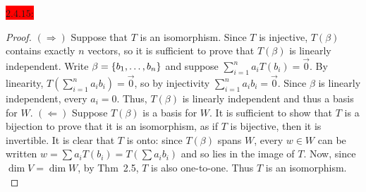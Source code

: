 \documentclass{exam}
\begin{document}
  \colorbox{red}{\underline{$2.4.15$}:}
  \begin{solution}
    \begin{proof}
      $(\Rightarrow)$ Suppose that $T$ is an isomorphism. Since $T$ is injective, $T(\beta)$ contains exactly $n$ vectors, so it is sufficient to prove that $T(\beta)$ is linearly independent. Write $\beta = \left\{b_1, \dots, b_n \right\}$ and suppose $\sum_{i=1}^{n} a_i T(b_i) = \vec{0}$. By linearity, $T\left(\sum_{i=1}^{n} a_i b_i\right) = \vec{0}$, so by injectivity $\sum_{i=1}^{n} a_i b_i = \vec{0}$. Since $\beta$ is linearly independent, every $a_i = 0$. Thus, $T(\beta)$ is linearly independent and thus a basis for $W$.
      $(\Leftarrow)$ Suppose $T(\beta)$ is a basis for $W$. It is sufficient to show that $T$ is a bijection to prove that it is an isomorphism, as if $T$ is bijective, then it is invertible. It is clear that $T$ is onto: since $T(\beta)$ spans $W$, every $w \in W$ can be written $w = \sum a_i T(b_i) = T\left(\sum a_i b_i\right)$ and so lies in the image of $T$. Now, since $\dim V = \dim W$, by Thm~2.5, $T$ is also one-to-one. Thus $T$ is an isomorphism. \\
    \end{proof}
  \end{solution}
\end{document}
